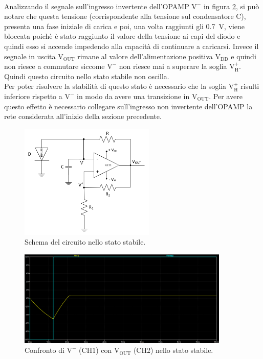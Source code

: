 \documentclass{report}
\begin{document}
\\Analizzando il segnale sull'ingresso invertente dell'OPAMP $\mathrm{V^-}$ in figura \ref{figura:simulazione1}, si può notare che questa tensione (corrispondente alla tensione sul condensatore C), presenta una fase iniziale di carica e poi, una volta raggiunti gli \SI{0.7}{\volt}, viene bloccata poichè è stato raggiunto il valore della tensione ai capi del diodo e quindi esso si accende impedendo alla capacità di continuare a caricarsi. Invece il segnale in uscita $\mathrm{V_{OUT}}$ rimane al valore dell'alimentazione positiva $\mathrm{V_{DD}}$ e quindi non riesce a commutare siccome $\mathrm{V^-}$ non riesce mai a superare la soglia $\mathrm{V_H^+}$. Quindi questo circuito nello stato stabile non oscilla.
\\Per poter risolvere la stabilità di questo stato è necessario che la soglia $\mathrm{V_H^+}$ risulti inferiore rispetto a $\mathrm{V^-}$ in modo da avere una transizione in $\mathrm{V_{OUT}}$. Per avere questo effetto è necessario collegare sull'ingresso non invertente dell'OPAMP la rete considerata all'inizio della sezione precedente.
\begin{figure}[h]
	\centering
	\includegraphics[height=5.5cm]{immagini/schema1stabile}
	\caption{Schema del circuito nello stato stabile.}
	\label{figura:schema1stabile}
\end{figure}
\begin{figure}[h]
	\centering
	\includegraphics[height=4.6cm]{immagini/plot_sim_stabile}
	\caption{Confronto di $\mathrm{V^-}$ (CH1) con $\mathrm{V_{OUT}}$ (CH2) nello stato stabile.}
	\label{figura:simulazione1}
\end{figure}
\end{document}
